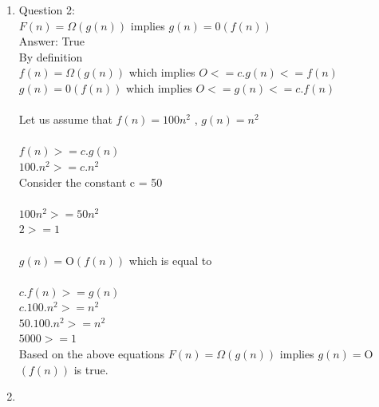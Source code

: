 \documentclass[11pt]{article}
\begin{document}
\begin{enumerate}

\itemsep 0.35in
 
\item

Question 2:\\
$F(n) = \Omega (g(n))$ implies $g(n) = $0$ (f(n))$ \\
Answer: True \\
By definition\\
$f(n) = \Omega (g(n))$ which implies  $O <= c.g(n) <= f(n)$ \\
$g(n) = $0$ (f(n))$ which implies $O <=  g(n) <= c.f(n)$ \\\\
Let us assume that $f(n) = 100n^2$ , $g(n) = n^2$ \\\\
$f(n) >=  c.g(n)$ \\
$100.n^2 >=  c.n^2$\\
Consider the constant c = 50 \\\\
$100n^2 >= 50n^2$ \\
$2 >= 1$ \\\\
$g(n) = $O$ (f(n))$ which is equal to \\\\ 
$c.f(n) >= g(n)$ \\ 
$c.100.n^2 >=  n^2$\\
$50.100.n^2 >= n^2$ \\
$5000 >= 1$ \\
Based on the above equations $F(n) = \Omega (g(n))$ implies $g(n) = $O$ (f(n))$ is true.
   
\item


\end{enumerate}
\end{document}
